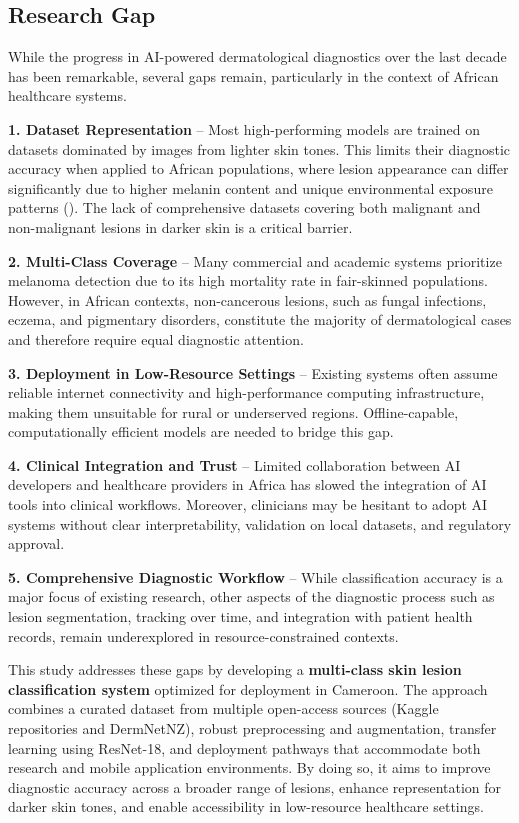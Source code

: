 \documentclass[
  12pt,
  oneside]{article}
\begin{document}
\subsection{Research Gap}\label{research-gap}

While the progress in AI-powered dermatological diagnostics over the
last decade has been remarkable, several gaps remain, particularly in
the context of African healthcare systems.

\textbf{1. Dataset Representation} -- Most high-performing models are
trained on datasets dominated by images from lighter skin tones. This
limits their diagnostic accuracy when applied to African populations,
where lesion appearance can differ significantly due to higher melanin
content and unique environmental exposure patterns
(). The lack of
comprehensive datasets covering both malignant and non-malignant lesions
in darker skin is a critical barrier.

\textbf{2. Multi-Class Coverage} -- Many commercial and academic systems
prioritize melanoma detection due to its high mortality rate in
fair-skinned populations. However, in African contexts, non-cancerous
lesions, such as fungal infections, eczema, and pigmentary disorders,
constitute the majority of dermatological cases and therefore require
equal diagnostic attention.

\textbf{3. Deployment in Low-Resource Settings} -- Existing systems
often assume reliable internet connectivity and high-performance
computing infrastructure, making them unsuitable for rural or
underserved regions. Offline-capable, computationally efficient models
are needed to bridge this gap.

\textbf{4. Clinical Integration and Trust} -- Limited collaboration
between AI developers and healthcare providers in Africa has slowed the
integration of AI tools into clinical workflows. Moreover, clinicians
may be hesitant to adopt AI systems without clear interpretability,
validation on local datasets, and regulatory approval.

\textbf{5. Comprehensive Diagnostic Workflow} -- While classification
accuracy is a major focus of existing research, other aspects of the
diagnostic process such as lesion segmentation, tracking over time, and
integration with patient health records, remain underexplored in
resource-constrained contexts.

This study addresses these gaps by developing a \textbf{multi-class skin
lesion classification system} optimized for deployment in Cameroon. The
approach combines a curated dataset from multiple open-access sources
(Kaggle repositories and DermNetNZ), robust preprocessing and
augmentation, transfer learning using ResNet-18, and deployment pathways
that accommodate both research and mobile application environments. By
doing so, it aims to improve diagnostic accuracy across a broader range
of lesions, enhance representation for darker skin tones, and enable
accessibility in low-resource healthcare settings.
\end{document}
